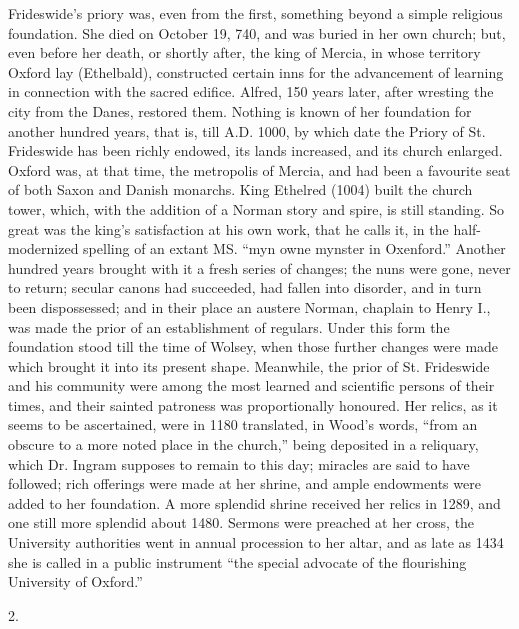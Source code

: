 Frideswide's priory was, even
from the first, something beyond a simple religious foundation. She
died on October 19, 740, and was buried in her own church; but, even
before her death, or shortly after, the king of Mercia, in whose
territory Oxford lay (Ethelbald), constructed certain inns for the
advancement of learning in connection with the sacred edifice. Alfred,
150 years later, after wresting the city from the Danes, restored
them. Nothing is known of her foundation for another hundred years,
that is, till A.D. 1000, by which date
the Priory of St. Frideswide has been richly endowed, its lands
increased, and its church enlarged. Oxford was, at that time, the
metropolis of Mercia, and had been a favourite seat of both Saxon and
Danish monarchs. King Ethelred (1004) built the church tower, which,
with the addition of a Norman story and spire, is still standing. So
great was the king's satisfaction at his own work, that he calls it,
in the half-modernized spelling of an extant MS. ``myn owne
mynster in Oxenford.'' Another hundred years brought with it a fresh
series of changes; the nuns were gone, never to return; secular canons
had succeeded, had fallen into disorder, and in turn been
dispossessed; and in their place an austere Norman, chaplain to Henry
I., was made the prior of an establishment of regulars. Under this
form the foundation stood till the time of Wolsey, when those further
changes were made which brought it into its present shape. Meanwhile,
the prior of St. Frideswide and his community were among the most
learned and scientific persons of their times, and their sainted
patroness was proportionally honoured. Her relics, as it seems to be
ascertained, were in 1180 translated, in Wood's words, ``from an
obscure to a more noted place in the church,'' being deposited in a
reliquary, which Dr. Ingram supposes to remain to this day; miracles
are said to have followed; rich offerings were made at her shrine, and
ample endowments were added to her foundation. A more splendid shrine
received her relics in 1289, and one still more splendid about 1480.
Sermons were preached at her cross, the University authorities went in
annual procession to her altar, and as late as 1434 she is called in a
public instrument ``the special advocate of the flourishing University
of Oxford.''

2.


